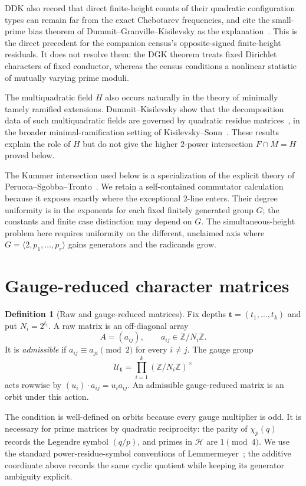 \documentclass[11pt]{article}
\theoremstyle{definition}
\newtheorem{definition}[theorem]{Definition}
\theoremstyle{remark}
\newcommand{\Z}{\mathbb Z}
\begin{document}
DDK also record that direct finite-height counts of their quadratic
configuration types can remain far from the exact Chebotarev frequencies,
and cite the small-prime bias theorem of Dummit--Granville--Kisilevsky as the
explanation~\cite{DDK,DGK}.  This is the direct precedent for the companion
census's opposite-signed finite-height residuals.  It does not resolve them:
the DGK theorem treats fixed Dirichlet characters of fixed conductor, whereas
the census conditions a nonlinear statistic of mutually varying prime moduli.

The multiquadratic field $H$ also occurs naturally in the theory of
minimally tamely ramified extensions.  Dummit--Kisilevsky show that the
decomposition data of such multiquadratic fields are governed by quadratic
residue matrices~\cite{DK}, in the broader minimal-ramification setting of
Kisilevsky--Sonn~\cite{KS}.  These results explain the role of $H$ but do
not give the higher $2$-power intersection $F\cap M=H$ proved below.

The Kummer intersection used below is a specialization of the explicit
theory of Perucca--Sgobba--Tronto~\cite{PST}.  We retain a self-contained
commutator calculation because it exposes exactly where the exceptional
$2$-line enters.  Their degree uniformity is in the exponents for each fixed
finitely generated group $G$; the constants and finite case distinction may
depend on $G$.  The simultaneous-height problem here requires uniformity on
the different, unclaimed axis where
$G=\langle2,p_1,\ldots,p_r\rangle$ gains generators and the radicands grow.

\section{Gauge-reduced character matrices}

\begin{definition}[Raw and gauge-reduced matrices]
Fix depths $\mathbf t=(t_1,\ldots,t_k)$ and put $N_i=2^{t_i}$.  A raw
matrix is an off-diagonal array
\[
  A=(a_{ij}),\qquad a_{ij}\in\Z/N_i\Z.
\]
It is \emph{admissible} if $a_{ij}\equiv a_{ji}\pmod2$ for every
$i\ne j$.  The gauge group
\[
  \mathcal U_{\mathbf t}=\prod_{i=1}^k(\Z/N_i\Z)^\times
\]
acts rowwise by $(u_i)\cdot a_{ij}=u_i a_{ij}$.  An admissible
gauge-reduced matrix is an orbit under this action.
\end{definition}

The condition is well-defined on orbits because every gauge multiplier is
odd.  It is necessary for prime matrices by quadratic reciprocity: the
parity of $\chi_p(q)$ records the Legendre symbol $(q/p)$, and primes in
$\mathcal H$ are $1\pmod4$.  We use the standard power-residue-symbol
conventions of Lemmermeyer~\cite[Chapter~4]{Lemmermeyer}; the additive
coordinate above records the same cyclic quotient while keeping its
generator ambiguity explicit.
\end{document}
